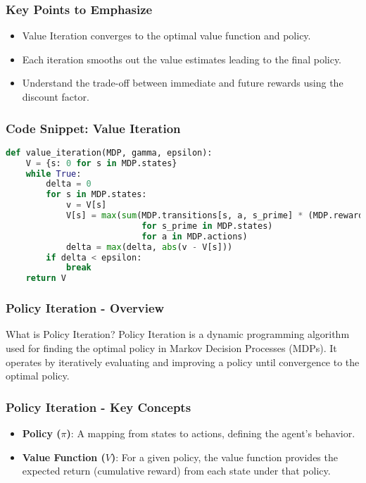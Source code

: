 \documentclass[aspectratio=169]{beamer}
\begin{document}
\begin{frame}[fragile]
    \frametitle{Key Points to Emphasize}
    \begin{itemize}
        \item Value Iteration converges to the optimal value function and policy.
        \item Each iteration smooths out the value estimates leading to the final policy.
        \item Understand the trade-off between immediate and future rewards using the discount factor.
    \end{itemize}
\end{frame}

\begin{frame}[fragile]
    \frametitle{Code Snippet: Value Iteration}
    \begin{lstlisting}[language=Python]
def value_iteration(MDP, gamma, epsilon):
    V = {s: 0 for s in MDP.states}
    while True:
        delta = 0
        for s in MDP.states:
            v = V[s]
            V[s] = max(sum(MDP.transitions[s, a, s_prime] * (MDP.rewards[s] + gamma * V[s_prime])
                           for s_prime in MDP.states)
                           for a in MDP.actions)
            delta = max(delta, abs(v - V[s]))
        if delta < epsilon:
            break
    return V
    \end{lstlisting}
\end{frame}

\begin{frame}[fragile]
    \frametitle{Policy Iteration - Overview}
    \begin{block}{What is Policy Iteration?}
        Policy Iteration is a dynamic programming algorithm used for finding the optimal policy in Markov Decision Processes (MDPs). 
        It operates by iteratively evaluating and improving a policy until convergence to the optimal policy.
    \end{block}
\end{frame}

\begin{frame}[fragile]
    \frametitle{Policy Iteration - Key Concepts}
    \begin{itemize}
        \item \textbf{Policy ($\pi$)}: A mapping from states to actions, defining the agent's behavior.
        \item \textbf{Value Function ($V$)}: For a given policy, the value function provides the expected return (cumulative reward) from each state under that policy.
    \end{itemize}
\end{frame}
\end{document}
